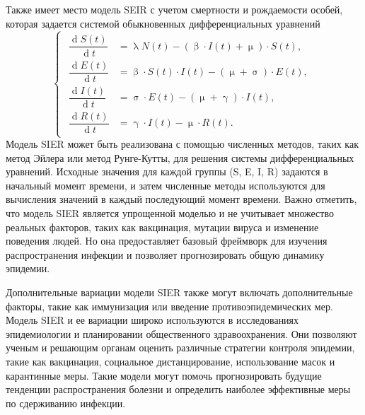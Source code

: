 \documentclass[a4paper, 12pt]{extarticle}
\numberwithin{equation}{section}
\renewcommand{\beta}{\upbeta}
\renewcommand{\gamma}{\upgamma}
\renewcommand{\sigma}{\upsigma}
\renewcommand{\lambda}{\uplambda}
\renewcommand{\mu}{\upmu}
\renewcommand{\d}{\operatorname{d}}
\begin{document}
	Также имеет место модель SEIR с учетом смертности и рождаемости особей, которая задается системой обыкновенных дифференциальных уравнений
	\begin{equation}
		\left\{ 
		\begin{gathered} 
			\begin{aligned}
				\dfrac {\d S(t)}{\d t} &= \lambda N(t) - (\beta \cdot I(t) +\mu)\cdot S(t),\\
				\dfrac {\d E(t)}{\d t} &= \beta \cdot S(t)\cdot I(t) - (\mu + \sigma)\cdot E(t),\\
				\dfrac{\d I(t)}{\d t} &=\sigma \cdot E(t) - (\mu + \gamma)\cdot I(t),\\
				\dfrac{\d R(t)}{\d t} &= \gamma\cdot I(t) - \mu \cdot R(t). 
			\end{aligned}
		\end{gathered} 
		\right.
	\end{equation}
	Модель SIER может быть реализована с помощью численных методов, таких как метод Эйлера или метод Рунге-Кутты, для решения системы дифференциальных уравнений. Исходные значения для каждой группы (S, E, I, R) задаются в начальный момент времени, и затем численные методы используются для вычисления значений в каждый последующий момент времени.
	Важно отметить, что модель SIER является упрощенной моделью и не учитывает множество реальных факторов, таких как вакцинация, мутации вируса и изменение поведения людей. Но она предоставляет базовый фреймворк для изучения распространения инфекции и позволяет прогнозировать общую динамику эпидемии.
	
	Дополнительные вариации модели SIER также могут включать дополнительные факторы, такие как иммунизация или введение противоэпидемических мер. Модель SIER и ее вариации широко используются в исследованиях эпидемиологии и планировании общественного здравоохранения. Они позволяют ученым и решающим органам оценить различные стратегии контроля эпидемии, такие как вакцинация, социальное дистанцирование, использование масок и карантинные меры. Такие модели могут помочь прогнозировать будущие тенденции распространения болезни и определить наиболее эффективные меры по сдерживанию инфекции.
	
\end{document}
